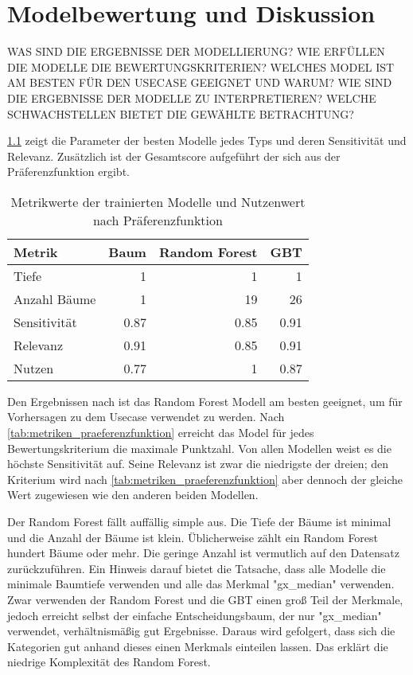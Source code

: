 \chapter{Modelbewertung und Diskussion}
\label{ch:modelbewertung}
WAS SIND DIE ERGEBNISSE DER MODELLIERUNG? WIE ERFÜLLEN DIE MODELLE DIE BEWERTUNGSKRITERIEN? WELCHES MODEL IST AM BESTEN FÜR DEN USECASE GEEIGNET UND WARUM? WIE SIND DIE ERGEBNISSE DER MODELLE ZU INTERPRETIEREN? WELCHE SCHWACHSTELLEN BIETET DIE GEWÄHLTE BETRACHTUNG?

\cref{tab:metrikwerte_der_trainierten_modelle} zeigt die Parameter der besten Modelle jedes Typs und deren Sensitivität und Relevanz. Zusätzlich ist der Gesamtscore aufgeführt der sich aus der Präferenzfunktion ergibt.

\begin{table}[ht]
	\raggedright
	\begin{tabularx}{\textwidth}{ | l | r | r | r|}
		\hline
		\rowcolor{lightgray}
		Metrik & Baum & Random Forest & GBT\\
		\hline
		Tiefe & 1 & 1 & 1\\
		Anzahl Bäume & 1 & 19 & 26\\
		Sensitivität & \num{0.87} & \num{0.85} & \num{0.91}\\
		Relevanz & \num{0.91} & \num{0.85} & \num{0.91}\\
		\hline
		\hline
		Nutzen & \num{0.77} & \num{1} & \num{0.87}\\
		\hline
	\end{tabularx}
	\caption{Metrikwerte der trainierten Modelle und Nutzenwert nach Präferenzfunktion}%
	\label{tab:metrikwerte_der_trainierten_modelle}	%
\end{table}


Den Ergebnissen nach ist das Random Forest Modell am besten geeignet, um für Vorhersagen zu dem Usecase verwendet zu werden. Nach \cref{tab:metriken_praeferenzfunktion} erreicht das Model für jedes Bewertungskriterium die maximale Punktzahl. Von allen Modellen weist es die höchste Sensitivität auf. Seine Relevanz ist zwar die niedrigste der dreien; den Kriterium wird nach \cref{tab:metriken_praeferenzfunktion} aber dennoch der gleiche Wert zugewiesen wie den anderen beiden Modellen.

Der Random Forest fällt auffällig simple aus. Die Tiefe der Bäume ist minimal und die Anzahl der Bäume ist klein. Üblicherweise zählt ein Random Forest hundert Bäume oder mehr. Die geringe Anzahl ist vermutlich auf den Datensatz zurückzuführen. Ein Hinweis darauf bietet die Tatsache, dass alle Modelle die minimale Baumtiefe verwenden und alle das Merkmal "gx\_median" verwenden. Zwar verwenden der Random Forest und die GBT einen groß Teil der Merkmale, jedoch erreicht selbst der einfache Entscheidungsbaum, der nur "gx\_median" verwendet, verhältnismäßig gut Ergebnisse. Daraus wird gefolgert, dass sich die Kategorien gut anhand dieses einen Merkmals einteilen lassen. Das erklärt die niedrige Komplexität des Random Forest.


